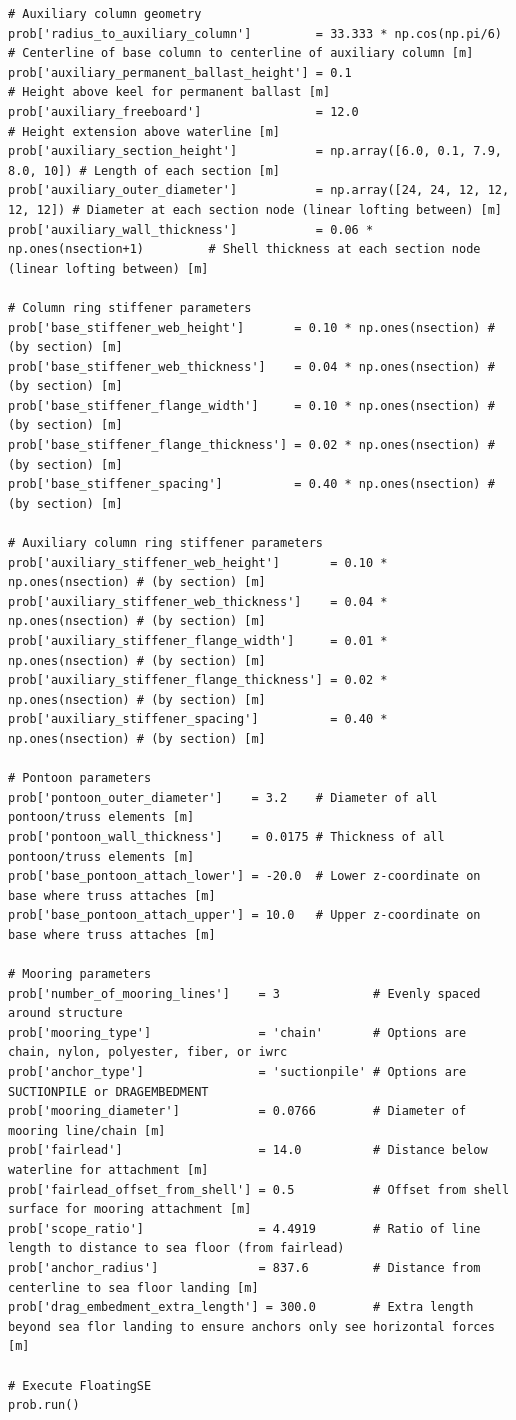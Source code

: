 \begin{lstlisting}
# Auxiliary column geometry
prob['radius_to_auxiliary_column']         = 33.333 * np.cos(np.pi/6) # Centerline of base column to centerline of auxiliary column [m]
prob['auxiliary_permanent_ballast_height'] = 0.1                      # Height above keel for permanent ballast [m]
prob['auxiliary_freeboard']                = 12.0                     # Height extension above waterline [m]
prob['auxiliary_section_height']           = np.array([6.0, 0.1, 7.9, 8.0, 10]) # Length of each section [m]
prob['auxiliary_outer_diameter']           = np.array([24, 24, 12, 12, 12, 12]) # Diameter at each section node (linear lofting between) [m]
prob['auxiliary_wall_thickness']           = 0.06 * np.ones(nsection+1)         # Shell thickness at each section node (linear lofting between) [m]

# Column ring stiffener parameters
prob['base_stiffener_web_height']       = 0.10 * np.ones(nsection) # (by section) [m]
prob['base_stiffener_web_thickness']    = 0.04 * np.ones(nsection) # (by section) [m]
prob['base_stiffener_flange_width']     = 0.10 * np.ones(nsection) # (by section) [m]
prob['base_stiffener_flange_thickness'] = 0.02 * np.ones(nsection) # (by section) [m]
prob['base_stiffener_spacing']          = 0.40 * np.ones(nsection) # (by section) [m]

# Auxiliary column ring stiffener parameters
prob['auxiliary_stiffener_web_height']       = 0.10 * np.ones(nsection) # (by section) [m]
prob['auxiliary_stiffener_web_thickness']    = 0.04 * np.ones(nsection) # (by section) [m]
prob['auxiliary_stiffener_flange_width']     = 0.01 * np.ones(nsection) # (by section) [m]
prob['auxiliary_stiffener_flange_thickness'] = 0.02 * np.ones(nsection) # (by section) [m]
prob['auxiliary_stiffener_spacing']          = 0.40 * np.ones(nsection) # (by section) [m]

# Pontoon parameters
prob['pontoon_outer_diameter']    = 3.2    # Diameter of all pontoon/truss elements [m]
prob['pontoon_wall_thickness']    = 0.0175 # Thickness of all pontoon/truss elements [m]
prob['base_pontoon_attach_lower'] = -20.0  # Lower z-coordinate on base where truss attaches [m]
prob['base_pontoon_attach_upper'] = 10.0   # Upper z-coordinate on base where truss attaches [m]

# Mooring parameters
prob['number_of_mooring_lines']    = 3             # Evenly spaced around structure
prob['mooring_type']               = 'chain'       # Options are chain, nylon, polyester, fiber, or iwrc
prob['anchor_type']                = 'suctionpile' # Options are SUCTIONPILE or DRAGEMBEDMENT
prob['mooring_diameter']           = 0.0766        # Diameter of mooring line/chain [m]
prob['fairlead']                   = 14.0          # Distance below waterline for attachment [m]
prob['fairlead_offset_from_shell'] = 0.5           # Offset from shell surface for mooring attachment [m]
prob['scope_ratio']                = 4.4919        # Ratio of line length to distance to sea floor (from fairlead)
prob['anchor_radius']              = 837.6         # Distance from centerline to sea floor landing [m]
prob['drag_embedment_extra_length'] = 300.0        # Extra length beyond sea flor landing to ensure anchors only see horizontal forces [m]

# Execute FloatingSE
prob.run()
\end{lstlisting}

